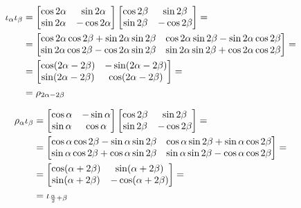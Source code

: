 \begin{align}
	\iota_\alpha \iota_\beta & = 
	\begin{bmatrix}
		\cos 2\alpha & \sin 2\alpha \\
		\sin 2\alpha & -\cos 2\alpha
	\end{bmatrix}
	\begin{bmatrix}
		\cos 2\beta & \sin 2\beta \\
		\sin 2\beta & -\cos 2\beta
	\end{bmatrix} 
	= \notag \\
	& = 
	\begin{bmatrix}
		\cos 2\alpha \cos 2\beta +\sin 2\alpha \sin 2\beta & \cos 2\alpha \sin 2\beta - \sin 2\alpha \cos 2\beta \\
		\sin 2\alpha \cos 2\beta - \cos 2\alpha \sin 2\beta & \sin 2\alpha \sin 2\beta + \cos 2\alpha \cos 2\beta
	\end{bmatrix} 
	= \notag \\
	& = 
	\begin{bmatrix}
		\cos (2\alpha - 2\beta) & - \sin (2\alpha - 2\beta) \\
		\sin (2\alpha - 2\beta) & \cos (2\alpha - 2\beta)
	\end{bmatrix} 
	= \notag \\
	\label{eqn:Isometrie_I_I}
	& = \rho_{2\alpha - 2\beta}
\end{align}

\begin{align}
	\rho_\alpha \iota_\beta & = 
	\begin{bmatrix}
		\cos \alpha & -\sin \alpha \\
		\sin \alpha & \cos \alpha
	\end{bmatrix}
	\begin{bmatrix}
		\cos 2\beta & \sin 2\beta \\
		\sin 2\beta & -\cos 2\beta
	\end{bmatrix} 
	= \notag \\
	& = 
	\begin{bmatrix}
		\cos \alpha \cos 2\beta -\sin \alpha \sin 2\beta & \cos \alpha \sin 2\beta + \sin \alpha \cos 2\beta \\
		\sin \alpha \cos 2\beta + \cos \alpha \sin 2\beta & \sin \alpha \sin 2\beta - \cos \alpha \cos 2\beta
	\end{bmatrix} 
	= \notag \\
	& = 
	\begin{bmatrix}
		\cos (\alpha + 2\beta) & \sin (\alpha + 2\beta) \\
		\sin (\alpha + 2\beta) & - \cos (\alpha + 2\beta)
	\end{bmatrix} 
	= \notag \\
	\label{eqn:Isometrie_R_I}
	& = \iota_{\frac{\alpha}{2} + \beta}
\end{align}

